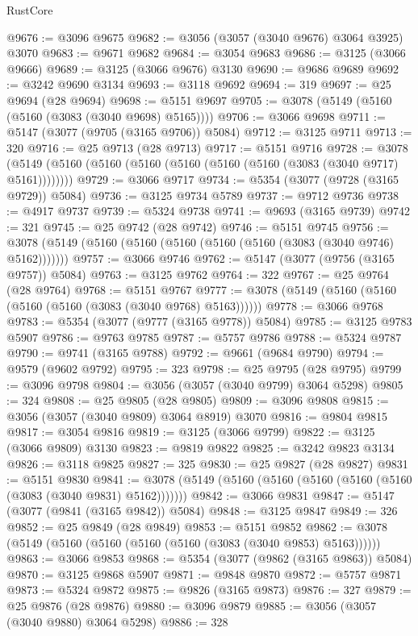 \begin{lexlean}{RustCore}
\begin{coremodule}
@9676 := @3096 @9675
@9682 := @3056 (@3057 (@3040 @9676) @3064 @3925) @3070
@9683 := @9671 @9682
@9684 := @3054 @9683
@9686 := @3125 (@3066 @9666)
@9689 := @3125 (@3066 @9676) @3130
@9690 := @9686 @9689
@9692 := @3242 @9690 @3134
@9693 := @3118 @9692
@9694 := 319
@9697 := @25 @9694 (@28 @9694)
@9698 := @5151 @9697
@9705 := @3078 (@5149 (@5160 (@5160 (@3083 (@3040 @9698) @5165))))
@9706 := @3066 @9698
@9711 := @5147 (@3077 (@9705 (@3165 @9706)) @5084)
@9712 := @3125 @9711
@9713 := 320
@9716 := @25 @9713 (@28 @9713)
@9717 := @5151 @9716
@9728 := @3078 (@5149 (@5160 (@5160 (@5160 (@5160 (@5160 (@5160 (@3083 (@3040 @9717) @5161))))))))
@9729 := @3066 @9717
@9734 := @5354 (@3077 (@9728 (@3165 @9729)) @5084)
@9736 := @3125 @9734 @5789
@9737 := @9712 @9736
@9738 := @4917 @9737
@9739 := @5324 @9738
@9741 := @9693 (@3165 @9739)
@9742 := 321
@9745 := @25 @9742 (@28 @9742)
@9746 := @5151 @9745
@9756 := @3078 (@5149 (@5160 (@5160 (@5160 (@5160 (@5160 (@3083 (@3040 @9746) @5162)))))))
@9757 := @3066 @9746
@9762 := @5147 (@3077 (@9756 (@3165 @9757)) @5084)
@9763 := @3125 @9762
@9764 := 322
@9767 := @25 @9764 (@28 @9764)
@9768 := @5151 @9767
@9777 := @3078 (@5149 (@5160 (@5160 (@5160 (@5160 (@3083 (@3040 @9768) @5163))))))
@9778 := @3066 @9768
@9783 := @5354 (@3077 (@9777 (@3165 @9778)) @5084)
@9785 := @3125 @9783 @5907
@9786 := @9763 @9785
@9787 := @5757 @9786
@9788 := @5324 @9787
@9790 := @9741 (@3165 @9788)
@9792 := @9661 (@9684 @9790)
@9794 := @9579 (@9602 @9792)
@9795 := 323
@9798 := @25 @9795 (@28 @9795)
@9799 := @3096 @9798
@9804 := @3056 (@3057 (@3040 @9799) @3064 @5298)
@9805 := 324
@9808 := @25 @9805 (@28 @9805)
@9809 := @3096 @9808
@9815 := @3056 (@3057 (@3040 @9809) @3064 @8919) @3070
@9816 := @9804 @9815
@9817 := @3054 @9816
@9819 := @3125 (@3066 @9799)
@9822 := @3125 (@3066 @9809) @3130
@9823 := @9819 @9822
@9825 := @3242 @9823 @3134
@9826 := @3118 @9825
@9827 := 325
@9830 := @25 @9827 (@28 @9827)
@9831 := @5151 @9830
@9841 := @3078 (@5149 (@5160 (@5160 (@5160 (@5160 (@5160 (@3083 (@3040 @9831) @5162)))))))
@9842 := @3066 @9831
@9847 := @5147 (@3077 (@9841 (@3165 @9842)) @5084)
@9848 := @3125 @9847
@9849 := 326
@9852 := @25 @9849 (@28 @9849)
@9853 := @5151 @9852
@9862 := @3078 (@5149 (@5160 (@5160 (@5160 (@5160 (@3083 (@3040 @9853) @5163))))))
@9863 := @3066 @9853
@9868 := @5354 (@3077 (@9862 (@3165 @9863)) @5084)
@9870 := @3125 @9868 @5907
@9871 := @9848 @9870
@9872 := @5757 @9871
@9873 := @5324 @9872
@9875 := @9826 (@3165 @9873)
@9876 := 327
@9879 := @25 @9876 (@28 @9876)
@9880 := @3096 @9879
@9885 := @3056 (@3057 (@3040 @9880) @3064 @5298)
@9886 := 328

\end{coremodule}
\end{lexlean}
